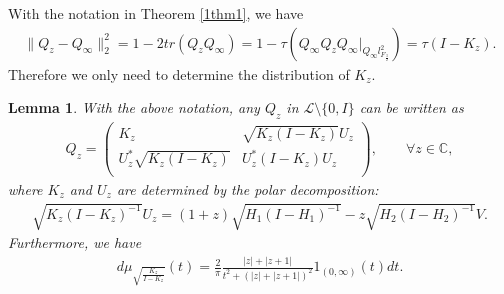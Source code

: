 \documentclass{amsart}
\newcommand{\LLL}{\mathcal L} %
\newcommand{\C}{\mathbb C} %
\newtheorem{lemma}{Lemma}[section]
\begin{document}
With the notation in Theorem \ref{1thm1}, we have 
\begin{align*}
\parallel Q_{z} - Q_{\infty} \parallel_{2}^{2} = 1-2tr(Q_{z}Q_{\infty}) = 1 - \tau(Q_{\infty}Q_{z}Q_{\infty}|_{Q_{\infty}l^{2}_{F_{\frac{3}{2}}}}) = \tau(I - K_z).
\end{align*}
Therefore we only need to determine the distribution of $K_z$.

\begin{lemma}\label{3lemma2}
With the above notation,  any $Q_{z}$ in $\LLL \setminus \{0, I \}$ can be written as
\begin{align*}
Q_{z} = \left(
     \begin{array}{cc}
      K_{z} & \sqrt{K_{z}(I-K_{z})}U_{z} \\
      U_{z}^{*}\sqrt{K_{z}(I-K_{z})} & U_{z}^{*}(I-K_{z})U_{z} \\
  \end{array}
\right) , \qquad \forall z \in \C,
\end{align*}
where $K_z$ and $U_z$ are determined by the polar decomposition:
\begin{align*}
\sqrt{K_{z}(I-K_{z})^{-1}}U_{z} = (1+z)\sqrt{H_{1}(I-H_{1})^{-1}}- z\sqrt{H_{2}(I-H_{2})^{-1}}V. 
\end{align*} 
Furthermore, we have 
\begin{align*}
d \mu_{\sqrt{\frac{K_z}{I-K_z}}}(t) = \frac{2}{\pi}\frac{|z|+|z+1|}{t^2 + (|z|+|z+1|)^2} 1_{(0, \infty)}(t) dt .
\end{align*}
\end{lemma}
\end{document}
